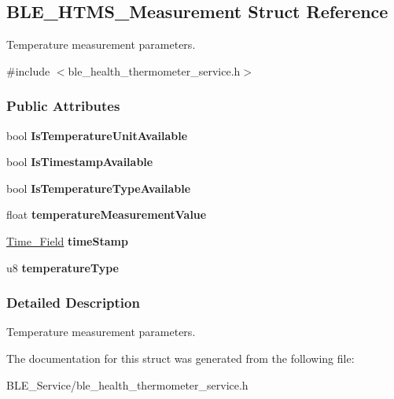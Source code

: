 \hypertarget{struct_b_l_e___h_t_m_s___measurement}{}\subsection{B\+L\+E\+\_\+\+H\+T\+M\+S\+\_\+\+Measurement Struct Reference}
\label{struct_b_l_e___h_t_m_s___measurement}


Temperature measurement parameters.  




{\ttfamily \#include $<$ble\+\_\+health\+\_\+thermometer\+\_\+service.\+h$>$}

\subsubsection*{Public Attributes}
\begin{DoxyCompactItemize}
\item 
bool {\bfseries Is\+Temperature\+Unit\+Available}\hypertarget{struct_b_l_e___h_t_m_s___measurement_a0629eb7ed16f59873102b65031223219}{}\label{struct_b_l_e___h_t_m_s___measurement_a0629eb7ed16f59873102b65031223219}

\item 
bool {\bfseries Is\+Timestamp\+Available}\hypertarget{struct_b_l_e___h_t_m_s___measurement_ae10dbae7d88e5f75b9876332f0be8a7b}{}\label{struct_b_l_e___h_t_m_s___measurement_ae10dbae7d88e5f75b9876332f0be8a7b}

\item 
bool {\bfseries Is\+Temperature\+Type\+Available}\hypertarget{struct_b_l_e___h_t_m_s___measurement_a7e0c61ed18dd6b4078a14786838d37ac}{}\label{struct_b_l_e___h_t_m_s___measurement_a7e0c61ed18dd6b4078a14786838d37ac}

\item 
float {\bfseries temperature\+Measurement\+Value}\hypertarget{struct_b_l_e___h_t_m_s___measurement_abed290b65d8d30f43c68177cb056c9f4}{}\label{struct_b_l_e___h_t_m_s___measurement_abed290b65d8d30f43c68177cb056c9f4}

\item 
\hyperlink{struct_time___field}{Time\+\_\+\+Field} {\bfseries time\+Stamp}\hypertarget{struct_b_l_e___h_t_m_s___measurement_ab4bb6234739a84473a880c222fbcf7fa}{}\label{struct_b_l_e___h_t_m_s___measurement_ab4bb6234739a84473a880c222fbcf7fa}

\item 
u8 {\bfseries temperature\+Type}\hypertarget{struct_b_l_e___h_t_m_s___measurement_a1661e67e5ccefd02bf9372ac3417e014}{}\label{struct_b_l_e___h_t_m_s___measurement_a1661e67e5ccefd02bf9372ac3417e014}

\end{DoxyCompactItemize}


\subsubsection{Detailed Description}
Temperature measurement parameters. 

The documentation for this struct was generated from the following file\+:\begin{DoxyCompactItemize}
\item 
B\+L\+E\+\_\+\+Service/ble\+\_\+health\+\_\+thermometer\+\_\+service.\+h\end{DoxyCompactItemize}
